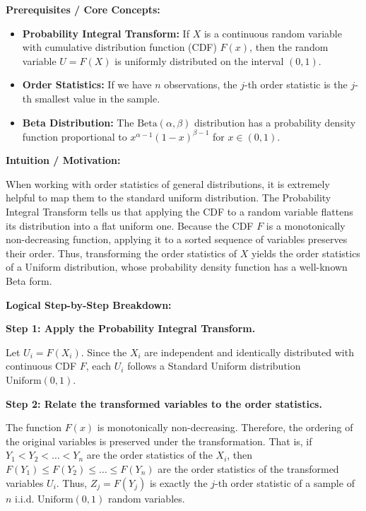 \begin{solution}
\textbf{Prerequisites / Core Concepts:}
\begin{itemize}
    \item \textbf{Probability Integral Transform:} If $X$ is a continuous random variable with cumulative distribution function (CDF) $F(x)$, then the random variable $U = F(X)$ is uniformly distributed on the interval $(0, 1)$.
    \item \textbf{Order Statistics:} If we have $n$ observations, the $j$-th order statistic is the $j$-th smallest value in the sample.
    \item \textbf{Beta Distribution:} The $\text{Beta}(\alpha, \beta)$ distribution has a probability density function proportional to $x^{\alpha-1}(1-x)^{\beta-1}$ for $x \in (0,1)$.
\end{itemize}

\textbf{Intuition / Motivation:}

When working with order statistics of general distributions, it is extremely helpful to map them to the standard uniform distribution. The Probability Integral Transform tells us that applying the CDF to a random variable flattens its distribution into a flat uniform one. Because the CDF $F$ is a monotonically non-decreasing function, applying it to a sorted sequence of variables preserves their order. Thus, transforming the order statistics of $X$ yields the order statistics of a Uniform distribution, whose probability density function has a well-known Beta form.

\textbf{Logical Step-by-Step Breakdown:}

\textbf{Step 1: Apply the Probability Integral Transform.}

Let $U_i = F(X_i)$. Since the $X_i$ are independent and identically distributed with continuous CDF $F$, each $U_i$ follows a Standard Uniform distribution $\text{Uniform}(0, 1)$.

\textbf{Step 2: Relate the transformed variables to the order statistics.}

The function $F(x)$ is monotonically non-decreasing. Therefore, the ordering of the original variables is preserved under the transformation. That is, if $Y_1 < Y_2 < \dots < Y_n$ are the order statistics of the $X_i$, then $F(Y_1) \leq F(Y_2) \leq \dots \leq F(Y_n)$ are the order statistics of the transformed variables $U_i$.
Thus, $Z_j = F(Y_j)$ is exactly the $j$-th order statistic of a sample of $n$ i.i.d. $\text{Uniform}(0, 1)$ random variables.


\end{solution}
